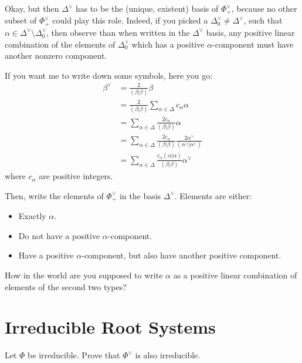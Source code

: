 \documentclass[11pt, headheight=30pt]{scrartcl}
\begin{document}
Okay, but then $\Delta^\vee$ has to be the (unique, existent) basis of $\Phi^\vee_+$,
because no other subset of $\Phi^\vee_+$ could play this role. Indeed, if you
picked a $\Delta_0^\vee\neq \Delta^\vee$, such that $\alpha \in \Delta^\vee\setminus \Delta_0^\vee$,
then observe than when written in the $\Delta^\vee$ basis, any positive
linear combination of the elements of $\Delta_0^\vee$ which has a positive $\alpha$-component
must have another nonzero component.

If you want me to write down some symbols, here you go:
\begin{align*}
    \beta^\vee &= \frac{2}{(\beta|\beta)}\beta\\
            &= \frac{2}{(\beta|\beta)}\sum_{\alpha\in\Delta} c_\alpha \alpha\\
            &= \sum_{\alpha\in\Delta} \frac{2c_\alpha}{(\beta|\beta)}\alpha\\
            &= \sum_{\alpha\in\Delta} \frac{2c_\alpha}{(\beta|\beta)} \frac{2\alpha^\vee}{(\alpha^\vee|\alpha^\vee)}\\
            &= \sum_{\alpha\in\Delta} \frac{c_\alpha (\alpha|\alpha)}{(\beta|\beta)} \alpha^\vee
\end{align*}
where $c_\alpha$ are positive integers.

Then, write the elements of $\Phi^\vee_+$ in the basis $\Delta^\vee$.
Elements are either:
\begin{itemize}
    \item Exactly $\alpha$.
    \item Do not have a positive $\alpha$-component.
    \item Have a positive $\alpha$-component, but also have another positive component.
\end{itemize}

How in the world are you supposed to write $\alpha$ as a positive
linear combination of elements of the second two types?



\section{Irreducible Root Systems}
\begin{prob}
    Let $\Phi$ be irreducible. Prove that $\Phi^\vee$ is also irreducible.
\end{prob}
\end{document}

